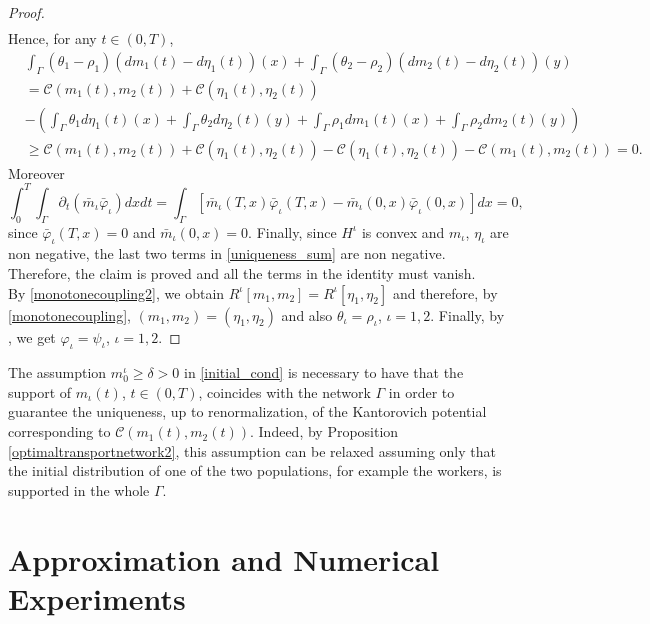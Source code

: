 \documentclass[smallextended,referee,envcountsect,]{svjour3}
\newcommand{\G}{\Gamma}
\newcommand{\cC}{{\mathcal C}}
\renewcommand{\phi}{\varphi}
\renewcommand{\d}{{\delta}}
\begin{document}
\begin{proof}
\begin{align*}
\end{align*}
Hence, for any $t\in (0,T)$,
\begin{align*}
&\int_{\Gamma}(\theta_1-\rho_1)(dm_1(t)-d\eta_1(t))(x)+\int_{\Gamma}(\theta_2-\rho_2)(dm_2(t)-d\eta_2(t))(y)\\
&= \cC(m_1(t), m_2(t))+ \cC(\eta_1(t), \eta_2(t))\\
&-\left(\int_{\Gamma}\theta_1d\eta_1(t)(x)+\int_{\Gamma}\theta_2d\eta_2(t)(y)+\int_{\Gamma}\rho_1dm_1(t)(x)+\int_{\Gamma}\rho_2dm_2(t)(y) \right)\\
&\geq  \cC(m_1(t), m_2(t))+ \cC(\eta_1(t), \eta_2(t))- \cC(\eta_1(t), \eta_2(t))- \cC(m_1(t), m_2(t))=0.
\end{align*}
Moreover
$$
\int_0^T\int_{\Gamma}\partial_t(\bar m_\iota\bar\phi_\iota)dxdt=\int_{\Gamma}[\bar m_\iota(T, x)\bar\phi_\iota(T, x)-\bar m_\iota(0, x)\bar\phi_\iota(0, x)]dx=0,
$$
since $\bar\phi_\iota(T, x)=0$ and $\bar m_\iota(0, x)=0$. Finally, since $H^\iota$ is convex and $m_\iota$, $\eta_\iota$ are non negative, the last two terms in \eqref{uniqueness_sum} are non negative. Therefore, the claim is proved and all the terms in the identity must vanish.\\
By \eqref{monotonecoupling2}, we obtain $R^\iota[m_1, m_2]=R^\iota[\eta_1, \eta_2]$ and therefore, by \eqref{monotonecoupling}, $(m_1, m_2)=(\eta_1, \eta_2)$ and also  $\theta_\iota=\rho_\iota$, $\iota=1,2$. Finally, by \cite[Theorem 4.1]{achdou}, we get $\phi_\iota=\psi_\iota$, $\iota=1, 2$.
\end{proof}
\begin{remark}
The assumption $m_0^\iota\ge\d>0$ in \eqref{initial_cond} is necessary to have that the support of $m_\iota(t)$, $t\in (0,T)$, coincides with the network $\G$ in order to guarantee the uniqueness, up to renormalization, of the Kantorovich potential corresponding to $ \cC(m_1(t),m_2(t))$. Indeed, by Proposition \ref{optimaltransportnetwork2}, this assumption can be relaxed assuming only that  the initial distribution of  one of the two populations, for example the  workers, is supported in the whole $\G$.	
\end{remark}



\section{Approximation and Numerical Experiments}\label{sec:discretization}
\end{document}
